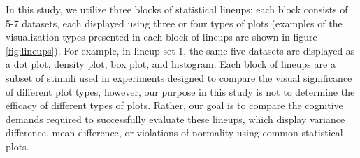 \documentclass[journal]{vgtc}\usepackage[]{graphicx}\usepackage[]{color}
\begin{document}
In this study, we utilize three blocks of statistical lineups; each block consists of 5-7 datasets, each displayed using three or four types of plots (examples of the visualization types presented in each block of lineups are shown in figure \ref{fig:lineups}). For example, in lineup set 1, the same five datasets are displayed as a dot plot, density plot, box plot, and histogram. Each block of lineups are a subset of stimuli used in experiments designed to compare the visual significance of different plot types, however, our purpose in this study is not to determine the efficacy of different types of plots. Rather, our goal is to compare the cognitive demands required to successfully evaluate these lineups, which display variance difference, mean difference, or violations of normality using common statistical plots.
\end{document}
